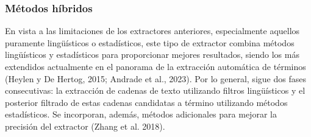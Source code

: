 \subsubsection{Métodos híbridos}\label{subsec:hybrid_methods}

En vista a las limitaciones de los extractores anteriores, especialmente aquellos puramente lingüísticos o estadísticos, este tipo de extractor combina métodos lingüísticos y estadísticos para proporcionar mejores resultados, siendo los más extendidos actualmente en el panorama de la extracción automática de términos (Heylen y De Hertog, 2015; Andrade et al., 2023). Por lo general, sigue dos fases consecutivas: la extracción de cadenas de texto utilizando filtros lingüísticos y el posterior filtrado de estas cadenas candidatas a término utilizando métodos estadísticos. Se incorporan, además, métodos adicionales para mejorar la precisión del extractor (Zhang et al. 2018).

